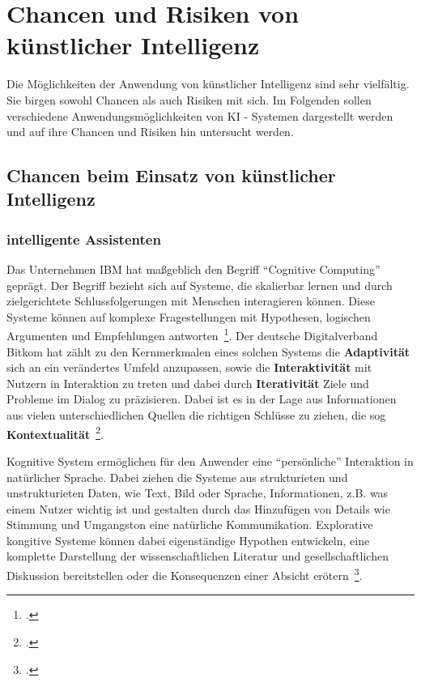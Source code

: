 \section{Chancen und Risiken von künstlicher Intelligenz} \label{Chancen und Risken von KI}
Die Möglichkeiten der Anwendung von künstlicher Intelligenz sind sehr vielfältig. Sie birgen sowohl Chancen als auch Risiken mit sich. 
Im Folgenden sollen verschiedene Anwendungsmöglichkeiten von KI - Systemen dargestellt werden und auf ihre Chancen und Risiken hin untersucht werden. 

\subsection{Chancen beim Einsatz von künstlicher Intelligenz}
\subsubsection{intelligente Assistenten}
Das Unternehmen IBM hat maßgeblich den Begriff \enquote{Cognitive Computing} geprägt. Der Begriff bezieht sich auf Systeme,
die skalierbar lernen und durch zielgerichtete Schlussfolgerungen mit Menschen interagieren können.
Diese Systeme können auf komplexe Fragestellungen mit Hypothesen, logischen Argumenten und Empfehlungen antworten~\footcite[\vglf][]{Scherk.2017}.
Der deutsche Digitalverband Bitkom hat zählt zu den Kernmerkmalen eines solchen Systems die \textbf{Adaptivität} sich an ein verändertes Umfeld anzupassen, sowie die 
\textbf{Interaktivität} mit Nutzern in Interaktion zu treten und dabei durch \textbf{Iterativität} Ziele und Probleme im Dialog zu präzisieren. Dabei ist es in der Lage
aus Informationen aus vielen unterschiedlichen Quellen die richtigen Schlüsse zu ziehen, die sog \textbf{Kontextualität}~\footcite[\vglf][]{Scherk.2017}.

Kognitive System ermöglichen für den Anwender eine \enquote{persönliche} Interaktion in natürlicher Sprache. Dabei ziehen die Systeme aus strukturieten und unstrukturieten
Daten, wie Text, Bild oder Sprache, Informationen, z.B. was einem Nutzer wichtig ist und gestalten durch das Hinzufügen von Details wie Stimmung und Umgangston eine natürliche 
Kommumikation. 
Explorative kongitive Systeme können dabei eigenständige Hypothen entwickeln, eine komplette Darstellung der wissenschaftlichen Literatur und gesellschaftlichen
Diskussion bereitstellen oder die Konsequenzen einer Absicht erötern~\footcite[\vglf][]{Scherk.2017}.

